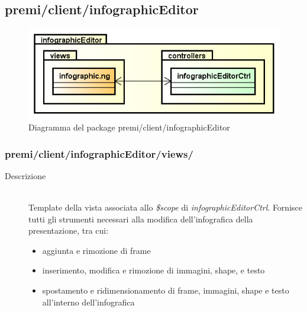 \clearpage
\subsection{premi/client/infographicEditor}
\begin{figure}[h]
\begin{center}
\includegraphics[scale=0.55]{img/diapkg/infographicEditor.png}
\caption{Diagramma del package premi/client/infographicEditor}
\end{center}
\end{figure}



\subsubsection{premi/client/infographicEditor/views/}

\begin{description}
\item[Descrizione] \hfill \\
	Template della vista associata allo \textit{\$scope} di \textit{infographicEditorCtrl}. Fornisce tutti gli strumenti necessari alla modifica dell'infografica della presentazione, tra cui:
	\begin{itemize}
			\item aggiunta e rimozione di frame
			\item inserimento, modifica e rimozione di immagini, shape, e testo
			\item spostamento e ridimensionamento di frame, immagini, shape  e testo all'interno dell'infografica
	\end{itemize}
\end{description}



















